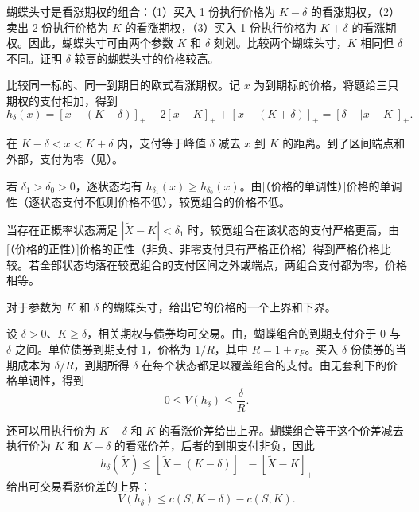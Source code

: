 \begin{problem}
\WJFiveProblem{} 蝴蝶头寸是看涨期权的组合：（1）买入 1 份执行价格为 $K-\delta$ 的看涨期权，（2）卖出 2 份执行价格为 $K$ 的看涨期权，（3）买入 1 份执行价格为 $K+\delta$ 的看涨期权。因此，蝴蝶头寸可由两个参数 $K$ 和 $\delta$ 刻划。比较两个蝴蝶头寸，$K$ 相同但 $\delta$ 不同。证明 $\delta$ 较高的蝴蝶头寸的价格较高。
\end{problem}
\begin{solution}[label-content={证明},blank-type=manual,blank-vsep=9\baselineskip]

比较同一标的、同一到期日的欧式看涨期权。记 $x$ 为到期标的价格，将题给三只期权的支付相加，得到
\[
 h_\delta(x)=[x-(K-\delta)]_+-2[x-K]_++[x-(K+\delta)]_+
 =[\delta-|x-K|]_+.
\]

 在 $K-\delta<x<K+\delta$ 内，支付等于峰值 $\delta$ 减去 $x$ 到 $K$ 的距离。到了区间端点和外部，支付为零\ifdefined\WJHandoutKnowledge（见）\fi。

若 $\delta_1>\delta_0>0$，逐状态均有 $h_{\delta_1}(x)\ge h_{\delta_0}(x)$。由\ifdefined\WJHandoutKnowledge {}[（价格的单调性）]\else 价格的单调性\fi（逐状态支付不低则价格不低），较宽组合的价格不低。

当存在正概率状态满足 $|\tilde X-K|<\delta_1$ 时，较宽组合在该状态的支付严格更高，由\ifdefined\WJHandoutKnowledge {}[（价格的正性）]\else 价格的正性\fi（非负、非零支付具有严格正价格）得到严格价格比较。若全部状态均落在较宽组合的支付区间之外或端点，两组合支付都为零，价格相等。
\end{solution}

\begin{problem}
\WJFiveProblem{} 对于参数为 $K$ 和 $\delta$ 的蝴蝶头寸，给出它的价格的一个上界和下界。
\end{problem}
\begin{solution}[blank-type=manual,blank-vsep=9\baselineskip]

设 $\delta>0$、$K\ge\delta$，相关期权与债券均可交易。由，蝴蝶组合的到期支付介于 $0$ 与 $\delta$ 之间。单位债券到期支付 $1$，价格为 $1/R$，其中 $R=1+r_F$。买入 $\delta$ 份债券的当期成本为 $\delta/R$，到期所得 $\delta$ 在每个状态都足以覆盖组合的支付。由无套利下的价格单调性，得到
\[
 0\le V(h_\delta)\le\frac\delta R.
\]

还可以用执行价为 $K-\delta$ 和 $K$ 的看涨价差给出上界。蝴蝶组合等于这个价差减去执行价为 $K$ 和 $K+\delta$ 的看涨价差，后者的到期支付非负，因此
\[
 h_\delta(\tilde X)\le[\tilde X-(K-\delta)]_+-[\tilde X-K]_+
\]
给出可交易看涨价差的上界：
\[
 V(h_\delta)\le c(S,K-\delta)-c(S,K).
\]
\end{solution}

